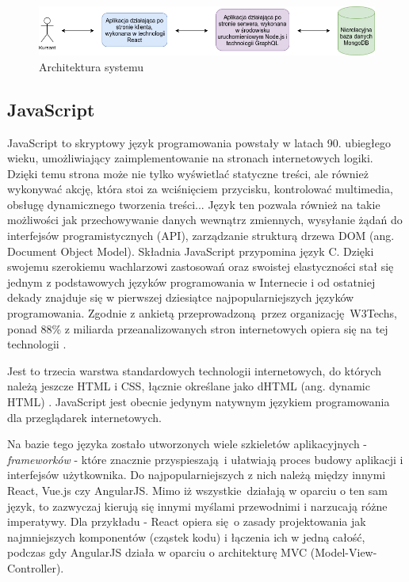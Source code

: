 \documentclass[12pt,twoside]{article}
\begin{document}
\begin{figure}[H]
	\centering
	\includegraphics[width=1\linewidth]{figures/app-architecture}
	\caption{Architektura systemu}
	\label{fig:system-architecture}
\end{figure}

\subsection{JavaScript}

JavaScript to skryptowy język programowania powstały w latach 90. ubiegłego wieku, umożliwiający zaimplementowanie na stronach internetowych logiki. Dzięki temu strona może nie tylko wyświetlać statyczne treści, ale również wykonywać akcję, która stoi za wciśnięciem przycisku, kontrolować multimedia, obsługę dynamicznego tworzenia treści... Język ten pozwala również na takie możliwości jak przechowywanie danych wewnątrz zmiennych, wysyłanie żądań do interfejsów programistycznych (API), zarządzanie strukturą drzewa DOM (ang. Document Object Model). Składnia JavaScript przypomina język C. Dzięki swojemu szerokiemu wachlarzowi zastosowań oraz swoistej elastyczności stał się jednym z podstawowych języków programowania w Internecie i od ostatniej dekady znajduje się w pierwszej dziesiątce najpopularniejszych języków programowania. Zgodnie z ankietą przeprowadzoną przez organizację W3Techs, ponad 88\% z miliarda przeanalizowanych stron internetowych opiera się na tej technologii \cite{JavascriptPopularity}. 

Jest to trzecia warstwa standardowych technologii internetowych, do których należą jeszcze HTML i CSS, łącznie określane jako dHTML (ang. dynamic HTML) \cite{JS}. JavaScript jest obecnie jedynym natywnym językiem programowania dla przeglądarek internetowych. 

Na bazie tego języka zostało utworzonych wiele szkieletów aplikacyjnych - \emph{frameworków} -  które znacznie przyspieszają i ułatwiają proces budowy aplikacji i interfejsów użytkownika. Do najpopularniejszych z nich należą między innymi React, Vue.js czy AngularJS. Mimo iż wszystkie działają w oparciu o ten sam język, to zazwyczaj kierują się innymi myślami przewodnimi i narzucają różne imperatywy. Dla przykładu - React opiera się o zasady projektowania jak najmniejszych komponentów (cząstek kodu) i łączenia ich w jedną całość, podczas gdy AngularJS działa w oparciu o architekturę MVC (Model-View-Controller).
\end{document}
